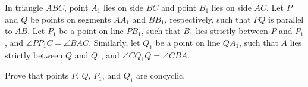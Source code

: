 In triangle $ABC$, point $A_1$ lies on side $BC$ and point $B_1$ lies on side $AC$. Let $P$ and $Q$ be points on segments $AA_1$ and $BB_1$, respectively, such that $PQ$ is parallel to $AB$. Let $P_1$ be a point on line $PB_1$, such that $B_1$ lies strictly between $P$ and $P_1$, and $\angle{PP_1C}=\angle{BAC}$. Similarly, let $Q_1$ be a point on line $QA_1$, such that $A$ lies strictly between $Q$ and $Q_1$, and $\angle{CQ_1Q}=\angle{CBA}$.

Prove that points $P$, $Q$, $P_1$, and $Q_1$ are concyclic.
